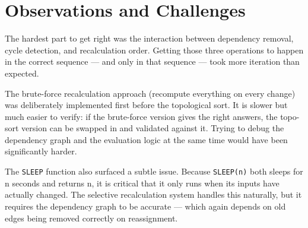 \documentclass[11pt,a4paper]{article}
\begin{document}
\section{Observations and Challenges}

The hardest part to get right was the interaction between dependency removal, cycle detection, and recalculation order. Getting those three operations to happen in the correct sequence --- and only in that sequence --- took more iteration than expected.

The brute-force recalculation approach (recompute everything on every change) was deliberately implemented first before the topological sort. It is slower but much easier to verify: if the brute-force version gives the right answers, the topo-sort version can be swapped in and validated against it. Trying to debug the dependency graph and the evaluation logic at the same time would have been significantly harder.

The \texttt{SLEEP} function also surfaced a subtle issue. Because \texttt{SLEEP(n)} both sleeps for n seconds and returns n, it is critical that it only runs when its inputs have actually changed. The selective recalculation system handles this naturally, but it requires the dependency graph to be accurate --- which again depends on old edges being removed correctly on reassignment.
\end{document}
